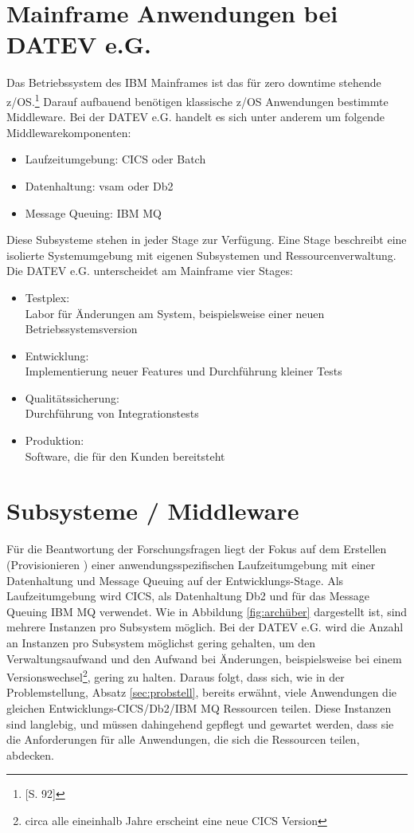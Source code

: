 \section{Mainframe Anwendungen bei DATEV e.G.}\label{sec:zosanw}
Das Betriebssystem des IBM Mainframes ist das für zero downtime stehende z/OS.\footnote{[S. 92]\cite{Ebbers.2011}}
Darauf aufbauend benötigen klassische z/OS Anwendungen bestimmte Middleware.
Bei der DATEV e.G. handelt es sich unter anderem um folgende Middlewarekomponenten:

\begin{itemize}
\item Laufzeitumgebung: CICS oder \Gls{Batch}
\item Datenhaltung: \Gls{vsam} oder Db2
\item Message Queuing: IBM MQ
\end{itemize}

Diese Subsysteme stehen in jeder Stage zur Verfügung.
Eine Stage beschreibt eine isolierte Systemumgebung mit eigenen Subsystemen und Ressourcenverwaltung.
Die DATEV e.G. unterscheidet am Mainframe vier Stages:
\begin{samepage}
\begin{itemize}
\item Testplex:\\
Labor für Änderungen am System, beispielsweise einer neuen Betriebssystemsversion
\item Entwicklung:\\
Implementierung neuer Features und Durchführung kleiner Tests
\item Qualitätssicherung:\\
Durchführung von Integrationstests
\item Produktion:\\
Software, die für den Kunden bereitsteht
\end{itemize}
\end{samepage}

\section{Subsysteme / Middleware}
Für die Beantwortung der Forschungsfragen liegt der Fokus auf dem Erstellen (\glqq Provisionieren \grqq) einer anwendungsspezifischen Laufzeitumgebung mit einer Datenhaltung und Message Queuing auf der Entwicklungs-Stage.
Als Laufzeitumgebung wird \glqq CICS\grqq, als Datenhaltung \glqq Db2\grqq{} und für das Message Queuing \glqq IBM MQ\grqq{} verwendet.
Wie in Abbildung \ref{fig:archüber} dargestellt ist, sind mehrere Instanzen pro Subsystem möglich.
Bei der DATEV e.G. wird die Anzahl an Instanzen pro Subsystem möglichst gering gehalten, um den Verwaltungsaufwand und den Aufwand bei Änderungen, beispielsweise bei einem Versionswechsel\footnote{circa alle eineinhalb Jahre erscheint eine neue CICS Version}, gering zu halten.
Daraus folgt, dass sich, wie in der Problemstellung, Absatz \ref{sec:probstell}, bereits erwähnt, viele Anwendungen die gleichen Entwicklungs-CICS/Db2/IBM MQ Ressourcen teilen.
Diese Instanzen sind langlebig, und müssen dahingehend gepflegt und gewartet werden, dass sie die Anforderungen für alle Anwendungen, die sich die Ressourcen teilen, abdecken. 

